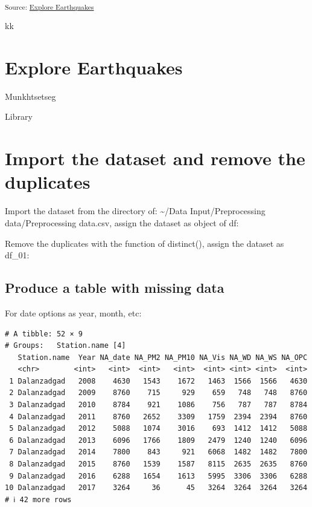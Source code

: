 \documentclass[
]{agujournal2019}
\begin{document}
\textsubscript{Source:
\href{https://EmouAcademy.github.io/my-awesome-manuscripts/notebooks/explore-earthquakes-preview.html\#cell-fig-spatial-plot}{Explore
Earthquakes}}

kk

\section{Explore Earthquakes}\label{explore-earthquakes}

Munkhtsetseg

Library

\section{Import the dataset and remove the
duplicates}\label{import-the-dataset-and-remove-the-duplicates}

Import the dataset from the directory of: \textasciitilde/Data
Input/Preprocessing data/Preprocessing data.csv, assign the dataset as
object of df:

Remove the duplicates with the function of distinct(), assign the
dataset as df\_01:

\subsection{Produce a table with missing
data}\label{produce-a-table-with-missing-data}

For date options as year, month, etc:

\begin{verbatim}
# A tibble: 52 × 9
# Groups:   Station.name [4]
   Station.name  Year NA_date NA_PM2 NA_PM10 NA_Vis NA_WD NA_WS NA_OPC
   <chr>        <int>   <int>  <int>   <int>  <int> <int> <int>  <int>
 1 Dalanzadgad   2008    4630   1543    1672   1463  1566  1566   4630
 2 Dalanzadgad   2009    8760    715     929    659   748   748   8760
 3 Dalanzadgad   2010    8784    921    1086    756   787   787   8784
 4 Dalanzadgad   2011    8760   2652    3309   1759  2394  2394   8760
 5 Dalanzadgad   2012    5088   1074    3016    693  1412  1412   5088
 6 Dalanzadgad   2013    6096   1766    1809   2479  1240  1240   6096
 7 Dalanzadgad   2014    7800    843     921   6068  1482  1482   7800
 8 Dalanzadgad   2015    8760   1539    1587   8115  2635  2635   8760
 9 Dalanzadgad   2016    6288   1654    1613   5995  3306  3306   6288
10 Dalanzadgad   2017    3264     36      45   3264  3264  3264   3264
# ℹ 42 more rows
\end{verbatim}
\end{document}
